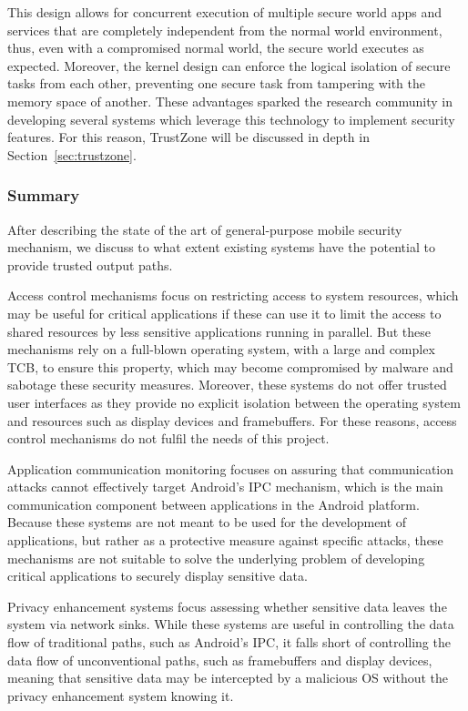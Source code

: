 This design allows for concurrent execution of multiple secure world apps and services that are completely independent from the normal world environment, thus, even with a compromised normal world, the secure world executes as expected. Moreover, the kernel design can enforce the logical isolation of secure tasks from each other, preventing one secure task from tampering with the memory space of another. These advantages sparked the research community in developing several systems which leverage this technology to implement security features. For this reason, TrustZone will be discussed in depth in Section~\ref{sec:trustzone}.

\subsubsection{Summary}

After describing the state of the art of general-purpose mobile security mechanism, we discuss to what extent existing systems have the potential to provide trusted output paths.

Access control mechanisms focus on restricting access to system resources, which may be useful for critical applications if these can use it to limit the access to shared resources by less sensitive applications running in parallel. But these mechanisms rely on a full-blown operating system, with a large and complex TCB, to ensure this property, which may become compromised by malware and sabotage these security measures. Moreover, these systems do not offer trusted user interfaces as they provide no explicit isolation between the operating system and resources such as display devices and framebuffers. For these reasons, access control mechanisms do not fulfil the needs of this project.

Application communication monitoring focuses on assuring that communication attacks cannot effectively target Android's IPC mechanism, which is the main communication component between applications in the Android platform. Because these systems are not meant to be used for the development of applications, but rather as a protective measure against specific attacks, these mechanisms are not suitable to solve the underlying problem of developing critical applications to securely display sensitive data.

Privacy enhancement systems focus assessing whether sensitive data leaves the system via network sinks. While these systems are useful in controlling the data flow of traditional paths, such as Android's IPC, it falls short of controlling the data flow of unconventional paths, such as framebuffers and display devices, meaning that sensitive data may be intercepted by a malicious OS without the privacy enhancement system knowing it.

